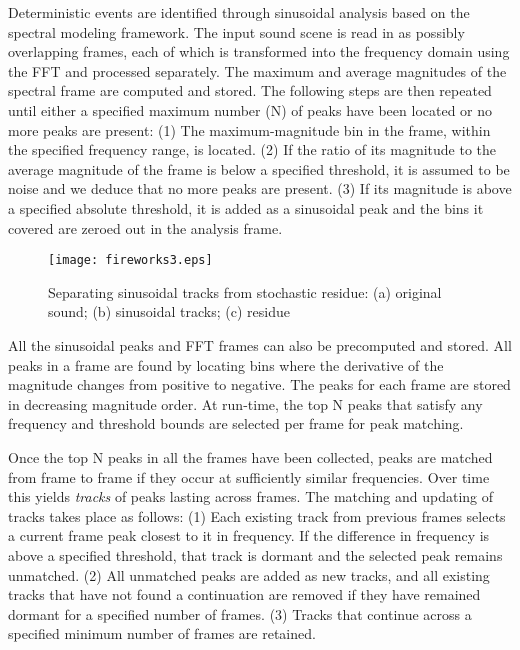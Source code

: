 \documentclass[a4paper]{article}
\begin{document}
Deterministic events are identified through sinusoidal analysis based on the 
spectral modeling framework. The input sound scene is read in as possibly overlapping 
frames, each of which is transformed into the frequency domain using the 
FFT and processed separately. The maximum and average 
magnitudes of the spectral frame are computed and stored. The following 
steps are then repeated until either a specified maximum number (N) of peaks 
have been located or no more peaks are present:
(1) The maximum-magnitude bin in the frame, within the specified frequency range, is 
located. 
(2) If the ratio of its magnitude to the average magnitude of the frame is 
below a specified threshold, it is assumed to be noise and we deduce that no 
more peaks are present. 
(3) If its magnitude is above a specified absolute threshold, it is added as a 
sinusoidal peak and the bins it covered are zeroed out in the analysis frame.
\begin{figure}[t]
\setlength\textfloatsep{0pt}
\setlength\abovecaptionskip{0pt}
\setlength\belowcaptionskip{0pt}
\centering
   \texttt{[image: fireworks3.eps]}
\caption{Separating sinusoidal tracks from stochastic residue: (a) original sound; 
(b) sinusoidal tracks; (c) residue}
\label{fig:sines}
\end{figure}

All the sinusoidal peaks and FFT frames can also be precomputed and stored. 
All peaks in a frame are found by locating bins where the derivative of the magnitude changes from 
positive to negative. The peaks for each frame are stored in decreasing magnitude order.
At run-time, the top N peaks that satisfy any frequency and threshold 
bounds are selected per frame for peak matching. 

Once the top N peaks in all the frames have been collected, peaks are matched  
from frame to frame if they occur at sufficiently similar frequencies. 
Over time this yields \emph{tracks} of peaks lasting across frames. The 
matching and updating of tracks takes place as follows:
(1) Each existing track from previous frames selects a current frame peak 
closest to it in frequency. If the difference in 
frequency is above a specified threshold, that track is dormant 
and the selected peak remains unmatched. 
(2) All unmatched peaks are 
added as new tracks, and all existing tracks that have not found a 
continuation are removed if they have remained dormant for a specified 
number of frames. 
(3) Tracks that continue across a specified minimum number of frames are retained. 
\end{document}
